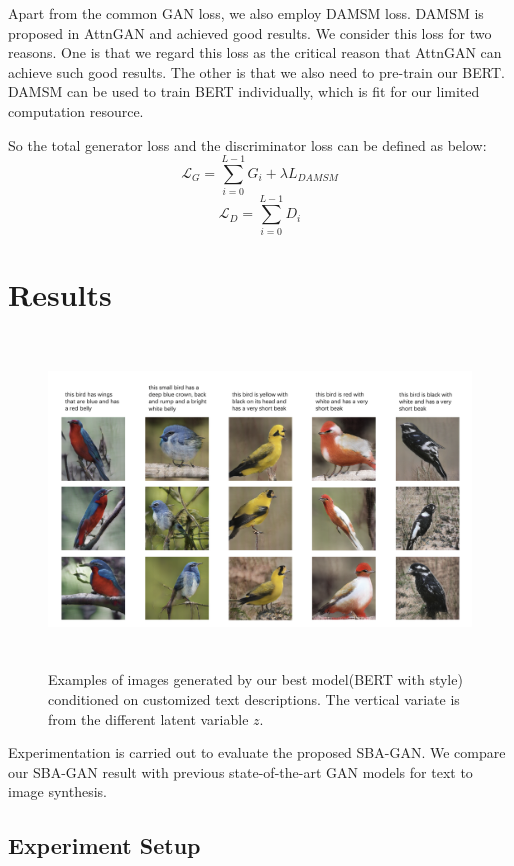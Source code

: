 \documentclass{article}
\begin{document}
Apart from the common GAN loss, we also employ DAMSM loss\cite{attngan}. DAMSM is proposed in AttnGAN and achieved good results. We consider this loss for two reasons. One is that we regard this loss as the critical reason that AttnGAN can achieve such good results. The other is that we also need to pre-train our BERT. DAMSM can be used to train BERT individually, which is fit for our limited computation resource.

So the total generator loss and the discriminator loss can be defined as below:
\begin{equation}
    \mathcal{L}_{G} = \sum_{i=0}^{L-1} G_i + \lambda L_{DAMSM}
\end{equation}
\begin{equation}
    \mathcal{L}_{D} = \sum_{i=0}^{L-1} D_i
\end{equation}


\section{Results}
\begin{figure}[htbp]

\centering
\includegraphics[width=450pt, height=250pt]{report/fig1.png} 
\caption{Examples of images generated by our best model(BERT with style) conditioned on
customized text descriptions. The vertical variate is from the different latent variable $z$.  }
\label{fig1}
\end{figure}

Experimentation is carried out to evaluate the
proposed SBA-GAN. We compare our SBA-GAN result with previous state-of-the-art GAN models for text to image synthesis.

\subsection{Experiment Setup}
\end{document}
